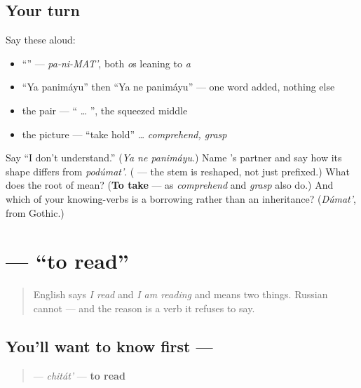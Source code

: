 \subsection*{Your turn}
Say these aloud:

\begin{itemize}
\raggedright
  \item \textquotedblleft{}\textquotedblright{} — \emph{pa-ni-MAT'}, both \emph{o}s leaning to \emph{a}
  \item \textquotedblleft{}Ya panimáyu\textquotedblright{} then \textquotedblleft{}Ya ne panimáyu\textquotedblright{} — one word added, nothing else
  \item the pair — \textquotedblleft{} … \textquotedblright{}, the squeezed middle
  \item the picture — \textquotedblleft{}take hold\textquotedblright{} … \emph{comprehend, grasp}
\end{itemize}

\begin{tcolorbox}[breakable,colback=teal!4,colframe=teal!35!black,title={Before you move on}]
Say \textquotedblleft{}I don't understand.\textquotedblright{} (\emph{Ya ne panimáyu}.) Name \emph{}'s partner and say how its shape differs from \emph{podúmat'}. (\textbf{} — the stem is reshaped, not just prefixed.) What does the root of \emph{} mean? (\textbf{To take} — as \emph{comprehend} and \emph{grasp} also do.) And which of your knowing-verbs is a borrowing rather than an inheritance? (\emph{Dúmat'}, from Gothic.)
\end{tcolorbox}
\section[\texorpdfstring{\ru{читать} (chitát')}{читать (chitát')}]{ — \textquotedblleft{}to read\textquotedblright{}}

\label{lesson:RU-C04-chitat}



\begin{quote}
English says \emph{I read} and \emph{I am reading} and means two things. Russian cannot — and the reason is a verb it refuses to say.
\end{quote}

\subsection*{You'll want to know first — }
\begin{quote}
\textbf{} — \emph{chitát'} — \textbf{to read}
\end{quote}


